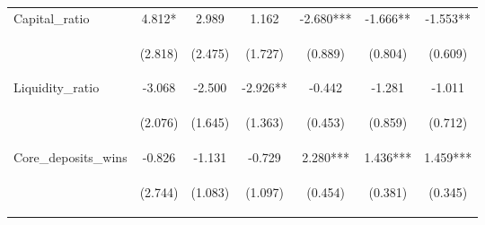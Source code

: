 \begin{tabular}{lcccccc}
Capital\_ratio & 4.812* & 2.989 & 1.162 & -2.680*** & -1.666** & -1.553** \\
\vspace{4pt} & \begin{footnotesize}(2.818)\end{footnotesize} & \begin{footnotesize}(2.475)\end{footnotesize} & \begin{footnotesize}(1.727)\end{footnotesize} & \begin{footnotesize}(0.889)\end{footnotesize} & \begin{footnotesize}(0.804)\end{footnotesize} & \begin{footnotesize}(0.609)\end{footnotesize} \\
Liquidity\_ratio & -3.068 & -2.500 & -2.926** & -0.442 & -1.281 & -1.011 \\
\vspace{4pt} & \begin{footnotesize}(2.076)\end{footnotesize} & \begin{footnotesize}(1.645)\end{footnotesize} & \begin{footnotesize}(1.363)\end{footnotesize} & \begin{footnotesize}(0.453)\end{footnotesize} & \begin{footnotesize}(0.859)\end{footnotesize} & \begin{footnotesize}(0.712)\end{footnotesize} \\
Core\_deposits\_wins & -0.826 & -1.131 & -0.729 & 2.280*** & 1.436*** & 1.459*** \\
\vspace{4pt} & \begin{footnotesize}(2.744)\end{footnotesize} & \begin{footnotesize}(1.083)\end{footnotesize} & \begin{footnotesize}(1.097)\end{footnotesize} & \begin{footnotesize}(0.454)\end{footnotesize} & \begin{footnotesize}(0.381)\end{footnotesize} & \begin{footnotesize}(0.345)\end{footnotesize} \\

\end{tabular}
